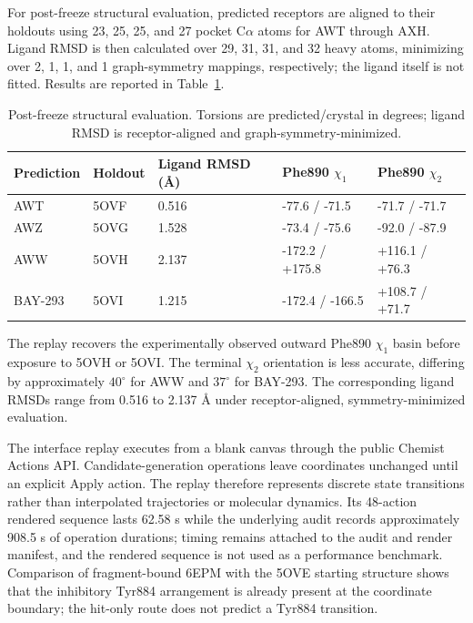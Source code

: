 \documentclass[11pt]{article}
\begin{document}
\begin{small}
For post-freeze structural evaluation, predicted receptors are aligned to their holdouts using 23, 25, 25, and 27 pocket C$\alpha$ atoms for AWT through AXH. Ligand RMSD is then calculated over 29, 31, 31, and 32 heavy atoms, minimizing over 2, 1, 1, and 1 graph-symmetry mappings, respectively; the ligand itself is not fitted. Results are reported in Table~\ref{tab:appA_sos1_eval}.

\begin{table}[htbp]
\centering\small
\caption{Post-freeze structural evaluation. Torsions are predicted/crystal in degrees; ligand RMSD is receptor-aligned and graph-symmetry-minimized.}
\label{tab:appA_sos1_eval}
\begin{tabular}{@{}lllll@{}}
\toprule
\textbf{Prediction} & \textbf{Holdout} & \textbf{Ligand RMSD (\AA{})} & \textbf{Phe890 $\chi_1$} & \textbf{Phe890 $\chi_2$}\\
\midrule
AWT & 5OVF & 0.516 & -77.6 / -71.5 & -71.7 / -71.7\\
AWZ & 5OVG & 1.528 & -73.4 / -75.6 & -92.0 / -87.9\\
AWW & 5OVH & 2.137 & -172.2 / +175.8 & +116.1 / +76.3\\
BAY-293 & 5OVI & 1.215 & -172.4 / -166.5 & +108.7 / +71.7\\
\bottomrule
\end{tabular}
\end{table}

The replay recovers the experimentally observed outward Phe890 $\chi_1$ basin before exposure to 5OVH or 5OVI. The terminal $\chi_2$ orientation is less accurate, differing by approximately $40^{\circ}$ for AWW and $37^{\circ}$ for BAY-293. The corresponding ligand RMSDs range from 0.516 to 2.137 \AA{} under receptor-aligned, symmetry-minimized evaluation.

The interface replay executes from a blank canvas through the public Chemist Actions API. Candidate-generation operations leave coordinates unchanged until an explicit Apply action. The replay therefore represents discrete state transitions rather than interpolated trajectories or molecular dynamics. Its 48-action rendered sequence lasts 62.58 s while the underlying audit records approximately 908.5 s of operation durations; timing remains attached to the audit and render manifest, and the rendered sequence is not used as a performance benchmark. Comparison of fragment-bound 6EPM with the 5OVE starting structure shows that the inhibitory Tyr884 arrangement is already present at the coordinate boundary; the hit-only route does not predict a Tyr884 transition.

\end{small}
\end{document}
